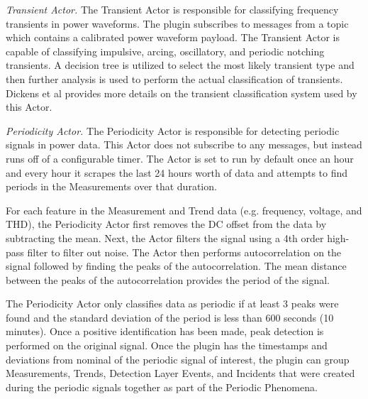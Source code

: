 {\em Transient Actor.} The Transient Actor is responsible for classifying frequency transients in power waveforms. The plugin subscribes to messages from a topic which contains a calibrated power waveform payload. The Transient Actor is capable of classifying impulsive, arcing, oscillatory, and periodic notching transients. A decision tree is utilized to select the most likely transient type and then further analysis is used to perform the actual classification of transients. Dickens et al \cite{dickens_transient_2019} provides more details on the transient classification system used by this Actor.

{\em Periodicity Actor.} The Periodicity Actor is responsible for detecting periodic signals in power data. This Actor does not subscribe to any messages, but instead runs off of a configurable timer. The Actor is set to run by default once an hour and every hour it scrapes the last 24 hours worth of data and attempts to find periods in the Measurements over that duration.

For each feature in the Measurement and Trend data (e.g. frequency, voltage, and THD), the Periodicity Actor first removes the DC offset from the data by subtracting the mean. Next, the Actor filters the signal using a 4th order high-pass filter to filter out noise. The Actor then performs autocorrelation on the signal followed by finding the peaks of the autocorrelation. The mean distance between the peaks of the autocorrelation provides the period of the signal.

The Periodicity Actor only classifies data as periodic if at least 3 peaks were found and the standard deviation of the period is less than 600 seconds (10 minutes). Once a positive identification has been made, peak detection is performed on the original signal. Once the plugin has the timestamps and deviations from nominal of the periodic signal of interest, the plugin can group Measurements, Trends, Detection Layer Events, and Incidents that were created during the periodic signals together as part of the Periodic Phenomena.



